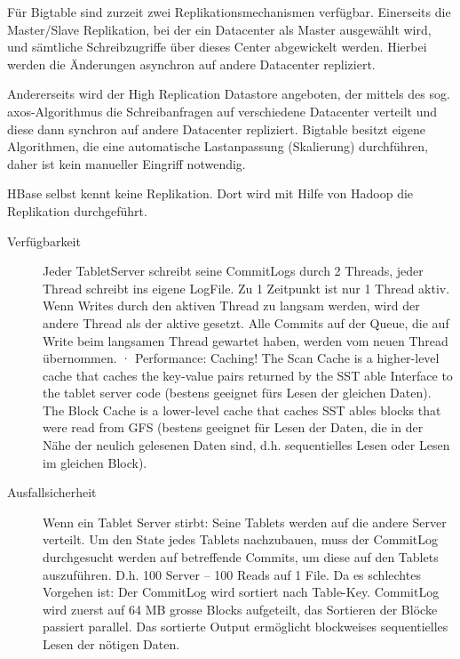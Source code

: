 \documentclass[a4paper,10pt,titlepage=false]{scrreprt}
\begin{document}
\begin{itemize}
\begin{enumerate}
Für Bigtable sind zurzeit zwei Replikationsmechanismen verfügbar. Einerseits die Master/Slave Replikation, bei der ein Datacenter als Master ausgewählt wird, und sämtliche Schreibzugriffe über dieses Center abgewickelt werden. Hierbei werden die Änderungen asynchron auf andere Datacenter repliziert. 

Andererseits wird der High Replication Datastore angeboten, der mittels des sog. axos-Algorithmus die Schreibanfragen auf verschiedene Datacenter verteilt und diese dann synchron auf andere Datacenter repliziert. Bigtable besitzt eigene Algorithmen, die eine automatische Lastanpassung (Skalierung) durchführen, daher ist kein manueller Eingriff notwendig.

HBase selbst kennt keine Replikation. Dort wird mit Hilfe von Hadoop die Replikation durchgeführt. 
\begin{description}
  \item[Verfügbarkeit]    Jeder TabletServer schreibt seine CommitLogs durch 2 Threads, jeder Thread schreibt ins eigene LogFile. Zu 1 Zeitpunkt ist nur 1 Thread aktiv. Wenn Writes durch den aktiven Thread zu langsam werden, wird der andere Thread als der aktive gesetzt. Alle Commits auf der Queue, die auf Write beim langsamen Thread gewartet haben, werden vom neuen Thread übernommen.
·         Performance: Caching! The Scan Cache is a higher-level cache that caches the key-value pairs returned by the SST able Interface to the tablet server code (bestens geeignet fürs Lesen der gleichen Daten). The Block Cache is a lower-level cache that caches SST ables blocks that were read from GFS (bestens geeignet für Lesen der Daten, die in der Nähe der neulich gelesenen Daten sind, d.h. sequentielles Lesen oder Lesen im gleichen Block).
\item[Ausfallsicherheit] Wenn ein Tablet Server stirbt: Seine Tablets werden auf die andere Server verteilt. Um den State jedes Tablets nachzubauen, muss der CommitLog durchgesucht werden auf betreffende Commits, um diese auf den Tablets auszuführen. D.h. 100 Server – 100 Reads auf 1 File. Da es schlechtes Vorgehen ist: Der CommitLog wird sortiert nach Table-Key. CommitLog wird zuerst auf 64 MB grosse Blocks aufgeteilt, das Sortieren der Blöcke passiert parallel. Das sortierte Output ermöglicht blockweises sequentielles Lesen der nötigen Daten.
\end{description}
\end{enumerate}

\end{itemize}
\end{document}
